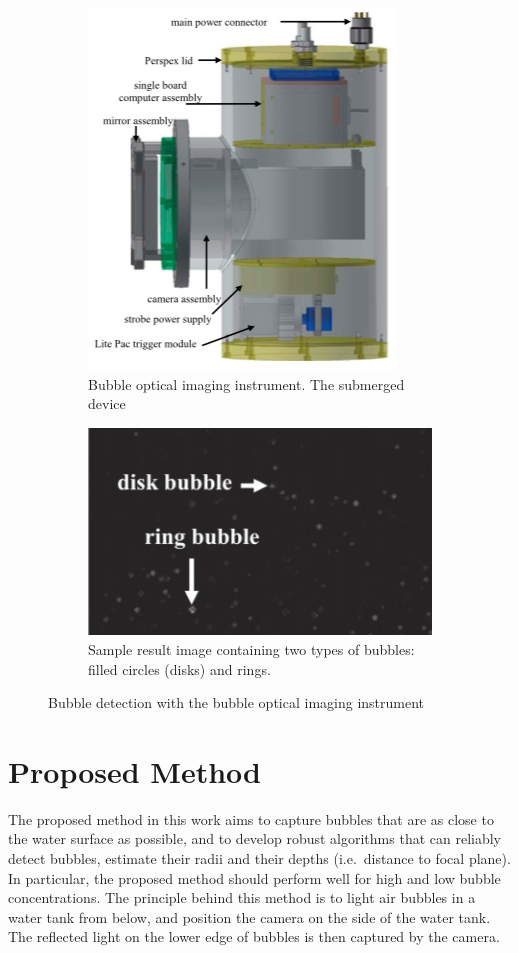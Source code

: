 		\begin{figure}[h!]
			\centering
			\begin{subfigure}[t]{0.4\textwidth}
				\centering
				\includegraphics[scale=.3]{images/bubble_optical_imaging_instrument.png}
				\caption{Bubble optical imaging instrument. The submerged device }
				\label{subfig:optical_imaging}
			\end{subfigure}\hfill
			\begin{subfigure}[t]{0.4\textwidth}
				\centering
				\includegraphics[scale=.5]{images/sample_result_optical_imaging_instrument.png}
				\caption{Sample result image containing two types of bubbles: filled circles (disks) and rings. }
				\label{subfig:result_optical_imaging}
			\end{subfigure}
			\label{fig:optical_imaging}
			\caption{Bubble detection with the bubble optical imaging instrument}
		\end{figure}		


\section{Proposed Method}
The proposed method in this work aims to capture bubbles that are as close to the water surface as possible, and to develop robust algorithms that can reliably detect bubbles, estimate their radii and their depths (i.e.\ distance to focal plane). In particular, the proposed method should perform well for high and low bubble concentrations. 
The principle behind this method is to light air bubbles in a water tank from below, and position the camera on the side of the water tank. The reflected light on the lower edge of bubbles is then captured by the camera. 

